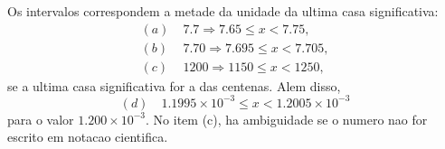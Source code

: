 Os intervalos correspondem a metade da unidade da ultima casa significativa:
\begin{align*}
(a)\;&7.7 \Rightarrow 7.65 \le x < 7.75, \\
(b)\;&7.70 \Rightarrow 7.695 \le x < 7.705, \\
(c)\;&1200 \Rightarrow 1150 \le x < 1250,
\end{align*}
se a ultima casa significativa for a das centenas. Alem disso,
\[
(d)\quad 1.1995\times 10^{-3} \le x < 1.2005\times 10^{-3}
\]
para o valor $1.200\times 10^{-3}$.
No item (c), ha ambiguidade se o numero nao for escrito em notacao cientifica.

